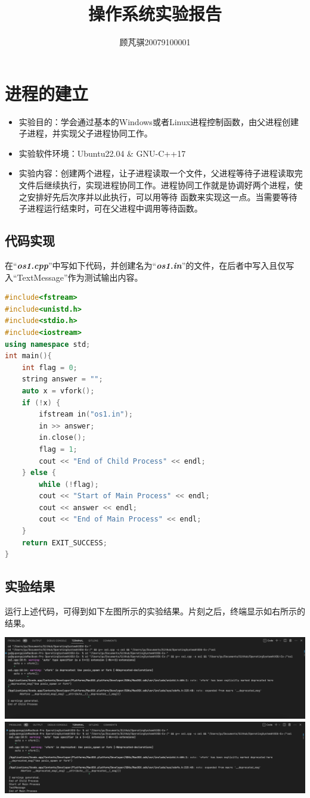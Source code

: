 \documentclass[UTF8]{ctexart}
\title{操作系统实验报告}
\author{顾芃骐20079100001}
\begin{document}
	\maketitle
	\newpage
	\section{进程的建立}
	\begin{itemize}
		\item 实验目的：学会通过基本的Windows或者Linux进程控制函数，由父进程创建子进程，并实现父子进程协同工作。
		\item 实验软件环境：Ubuntu22.04 \& GNU-C++17
		\item 实验内容：创建两个进程，让子进程读取一个文件，父进程等待子进程读取完文件后继续执行，实现进程协同工作。进程协同工作就是协调好两个进程，使之安排好先后次序并以此执行，可以用等待 函数来实现这一点。当需要等待子进程运行结束时，可在父进程中调用等待函数。
	\end{itemize}
	\subsection{代码实现}
    在“\textbf{\textit{os1.cpp}}”中写如下代码，并创建名为“\textbf{\textit{os1.in}}”的文件，在后者中写入且仅写入“TextMessage”作为测试输出内容。
\begin{lstlisting}[language=c++]
#include<fstream>
#include<unistd.h>
#include<stdio.h>
#include<iostream>
using namespace std;
int main(){
	int flag = 0;
	string answer = "";
	auto x = vfork();
	if (!x) {
		ifstream in("os1.in");
		in >> answer;
		in.close();
		flag = 1;
		cout << "End of Child Process" << endl;
	} else {
		while (!flag);
		cout << "Start of Main Process" << endl;
		cout << answer << endl;
		cout << "End of Main Process" << endl;
	}
	return EXIT_SUCCESS;
}
\end{lstlisting}
\subsection{实验结果}
运行上述代码，可得到如下左图所示的实验结果。片刻之后，终端显示如右所示的结果。
\begin{center}
        \includegraphics[width=0.3\pdfpagewidth]{os1-1.png}
        \includegraphics[width=0.3\pdfpagewidth]{os1-2.png}
\end{center}
\end{document}

